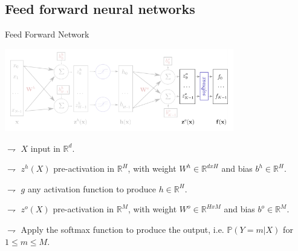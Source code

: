 \documentclass[9pt]{beamer}
\newcommand\R{\mathds{R}}
\begin{document}
\subsection{Feed forward neural networks}

\begin{frame}{Feed Forward Network}

\begin{center}
\includegraphics[width = 0.75\textwidth]{ffnn4.png}
\end{center}

$\rightharpoondown$ $X$ \alert{input in $\R^d$}.

$\rightharpoondown$ $z^h(X)$ \alert{pre-activation in $\R^H$}, with \alert{weight $W^h\in\R^{dxH}$} and \alert{bias $b^h\in\R^H$}.

$\rightharpoondown$ $g$ \alert{any activation function} to produce $h\in\R^H$.

$\rightharpoondown$ $z^o(X)$ \alert{pre-activation in $\R^M$}, with \alert{weight $W^o\in\R^{HxM}$} and \alert{bias $b^o\in\R^M$}.

$\rightharpoondown$  Apply the \alert{softmax function to produce the output}, i.e. $\mathbb{P}(Y=m|X)$ for $1\leqslant m \leqslant M$.
\end{frame}
\end{document}
